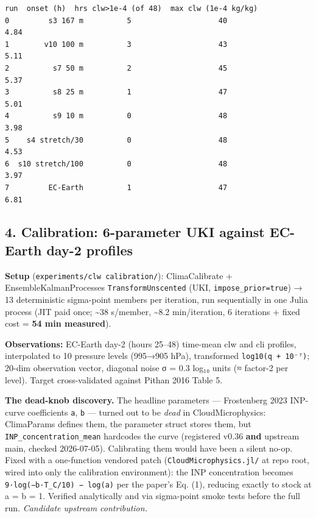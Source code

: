 \documentclass[11pt]{article}
\makeatletter
\newcommand{\boxspacing}{\kern\kvtcb@left@rule\kern\kvtcb@boxsep}
\newcommand{\prompt}[4]{
        {\ttfamily\llap{{\color{#2}[#3]:\hspace{3pt}#4}}\vspace{-\baselineskip}}
    }
\makeatother
\begin{document}
            \begin{tcolorbox}[breakable, size=fbox, boxrule=.5pt, pad at break*=1mm, opacityfill=0]
\prompt{Out}{outcolor}{12}{\boxspacing}
\begin{Verbatim}[commandchars=\\\{\}]
               run  onset (h)  hrs clw>1e-4 (of 48)  max clw (1e-4 kg/kg)
0         s3 167 m          5                    40                  4.84
1        v10 100 m          3                    43                  5.11
2          s7 50 m          2                    45                  5.37
3          s8 25 m          1                    47                  5.01
4          s9 10 m          0                    48                  3.98
5    s4 stretch/30          0                    48                  4.53
6  s10 stretch/100          0                    48                  3.97
7         EC-Earth          1                    47                  6.81
\end{Verbatim}
\end{tcolorbox}
        
    \subsection{4. Calibration: 6-parameter UKI against EC-Earth day-2
profiles}\label{calibration-6-parameter-uki-against-ec-earth-day-2-profiles}

\textbf{Setup} (\texttt{experiments/clw\ calibration/}): ClimaCalibrate
+ EnsembleKalmanProcesses \texttt{TransformUnscented} (UKI,
\texttt{impose\_prior=true}) → 13 deterministic sigma-point members per
iteration, run sequentially in one Julia process (JIT paid once;
\textasciitilde38 s/member, \textasciitilde8.2 min/iteration, 6
iterations + fixed cost = \textbf{54 min measured}).

\textbf{Observations:} EC-Earth day-2 (hours 25--48) time-mean clw and
cli profiles, interpolated to 10 pressure levels (995→905 hPa),
transformed \texttt{log10(q\ +\ 10⁻⁷)}; 20-dim observation vector,
diagonal noise σ = 0.3 log₁₀ units (≈ factor-2 per level). Target
cross-validated against Pithan 2016 Table 5.

\textbf{The dead-knob discovery.} The headline parameters ---
Frostenberg 2023 INP-curve coefficients \texttt{a}, \texttt{b} ---
turned out to be \emph{dead} in CloudMicrophysics: ClimaParams defines
them, the parameter struct stores them, but
\texttt{INP\_concentration\_mean} hardcodes the curve (registered v0.36
\textbf{and} upstream main, checked 2026-07-05). Calibrating them would
have been a silent no-op. Fixed with a one-function vendored patch
(\texttt{CloudMicrophysics.jl/} at repo root, wired into only the
calibration environment): the INP concentration becomes
\texttt{9·log(−b·T\_C/10)\ −\ log(a)} per the paper's Eq. (1), reducing
exactly to stock at a = b = 1. Verified analytically and via sigma-point
smoke tests before the full run. \emph{Candidate upstream contribution.}
\end{document}
